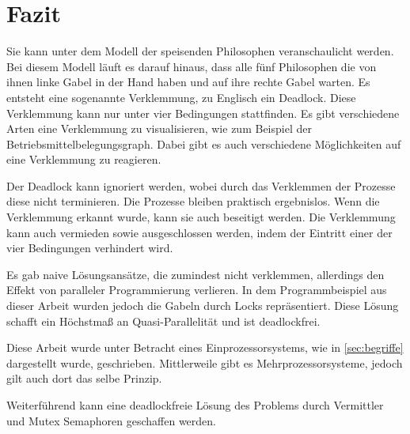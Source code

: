 \chapter{Fazit}
\label{fazit}

Sie kann unter dem Modell der speisenden Philosophen veranschaulicht werden. Bei diesem Modell läuft es darauf hinaus, dass alle fünf Philosophen die von ihnen linke Gabel in der Hand haben und auf ihre rechte Gabel warten. Es entsteht eine sogenannte Verklemmung, zu Englisch ein Deadlock. Diese Verklemmung kann nur unter vier Bedingungen stattfinden. Es gibt verschiedene Arten eine Verklemmung zu visualisieren, wie zum Beispiel der Betriebsmittelbelegungsgraph. Dabei gibt es auch verschiedene Möglichkeiten auf eine Verklemmung zu reagieren. 

Der Deadlock kann ignoriert werden, wobei durch das Verklemmen der Prozesse diese nicht terminieren. Die Prozesse bleiben praktisch ergebnislos. 
Wenn die Verklemmung erkannt wurde, kann sie auch beseitigt werden.
Die Verklemmung kann auch vermieden sowie ausgeschlossen werden, indem der Eintritt einer der vier Bedingungen verhindert wird.

Es gab naive Lösungsansätze, die zumindest nicht verklemmen, allerdings den Effekt von paralleler Programmierung verlieren. 
In dem Programmbeispiel aus dieser Arbeit wurden jedoch die Gabeln durch Locks repräsentiert. Diese Lösung schafft ein Höchstmaß an Quasi-Parallelität und ist deadlockfrei. 

Diese Arbeit wurde unter Betracht eines Einprozessorsystems, wie in \ref{sec:begriffe}  dargestellt wurde, geschrieben. Mittlerweile gibt es Mehrprozessorsysteme, jedoch gilt auch dort das selbe Prinzip.

Weiterführend kann eine deadlockfreie Lösung des Problems durch Vermittler und Mutex Semaphoren geschaffen werden. 